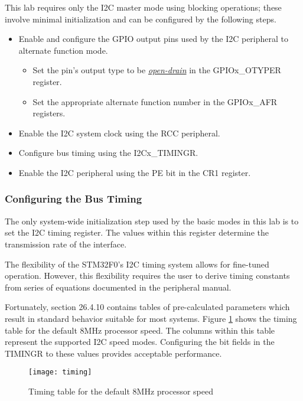 \documentclass[11pt,fleqn]{book} %
\begin{document}
    This lab requires only the I2C master mode using blocking operations; these involve minimal initialization and can be configured by the following steps.
    
    \begin{itemize}
        \item Enable and configure the GPIO output pins used by the I2C peripheral to alternate function mode.
        \begin{itemize}
            \item Set the pin's output type to be \underline{\textit{open-drain}} in the GPIOx\_OTYPER register. 
            \item Set the appropriate alternate function number in the GPIOx\_AFR registers. 
        \end{itemize}
        \item Enable the I2C system clock using the RCC peripheral.
        \item Configure bus timing using the I2Cx\_TIMINGR.
        \item Enable the I2C peripheral using the PE bit in the CR1 register.
    \end{itemize} 
     
    \subsubsection{Configuring the Bus Timing}
    The only system-wide initialization step used by the basic modes in this lab is to set the I2C timing register. The values within this register determine the transmission rate of the interface. 
    
    The flexibility of the STM32F0's I2C timing system allows for fine-tuned operation. However, this flexibility requires the user to derive timing constants from series of equations documented in the peripheral manual. 
    
    Fortunately, section 26.4.10 contains tables of pre-calculated parameters which result in standard behavior suitable for most systems. Figure \ref{timing} shows the timing table for the default 8MHz processor speed. The columns within this table represent the supported  I2C speed modes. Configuring the bit fields in the TIMINGR to these values provides acceptable performance.  

    \begin{figure}[]
        \centering\texttt{[image: timing]}
        \caption{Timing table for the default 8MHz processor speed}
        \label{timing}
    \end{figure}
\end{document}
